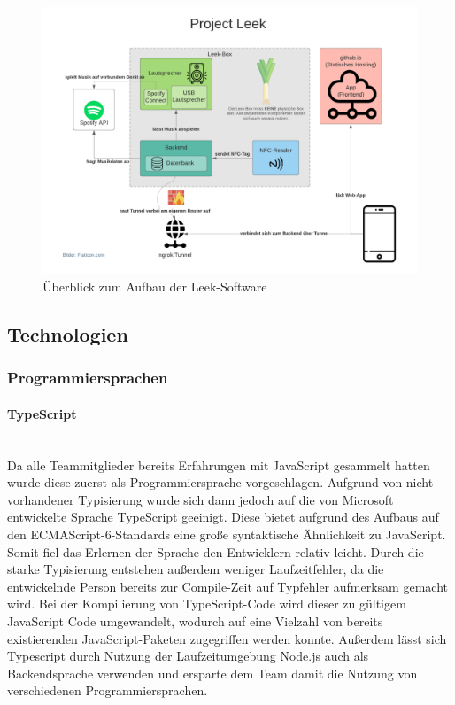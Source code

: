 \documentclass[10pt, a4paper]{article}
\begin{document}
\begin{onehalfspace}
  \begin{figure}[h]
    \includegraphics[width=\linewidth]{LeekSoftware_Overview.png}
    \caption{Überblick zum Aufbau der Leek-Software}
    \label{fig:LeekSoftwareOverview}
  \end{figure}

  \subsection{Technologien}

  \label{technologien}

  \subsubsection{Programmiersprachen}

  \paragraph*{TypeScript} $~$ \\
  Da alle Teammitglieder bereits Erfahrungen mit JavaScript gesammelt hatten wurde diese zuerst als Programmiersprache vorgeschlagen.
  Aufgrund von nicht vorhandener Typisierung wurde sich dann jedoch auf die von Microsoft entwickelte Sprache TypeScript geeinigt. Diese bietet aufgrund des
  Aufbaus auf den ECMAScript-6-Standards eine große syntaktische Ähnlichkeit zu JavaScript. Somit fiel das Erlernen der Sprache den Entwicklern relativ leicht.
  Durch die starke Typisierung entstehen außerdem weniger Laufzeitfehler, da die entwickelnde Person bereits zur Compile-Zeit auf Typfehler aufmerksam gemacht wird.\cite{Typescript_Typisierung}
  Bei der Kompilierung von TypeScript-Code wird dieser zu gültigem JavaScript Code umgewandelt, wodurch auf eine Vielzahl von bereits existierenden JavaScript-Paketen zugegriffen werden konnte.
  Außerdem lässt sich Typescript durch Nutzung der Laufzeitumgebung Node.js auch als Backendsprache verwenden und ersparte dem Team damit die Nutzung von verschiedenen Programmiersprachen.



\end{onehalfspace}
\end{document}
